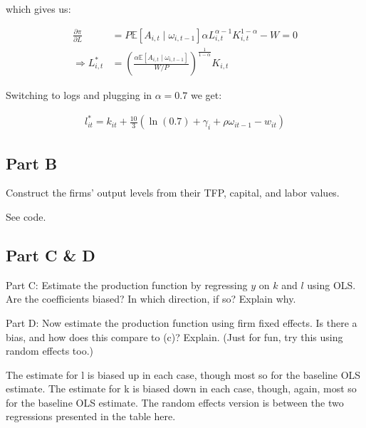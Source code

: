 \documentclass[10pt]{article}
\begin{document}
which gives us:

\begin{align}
    \frac{\partial \pi}{\partial L} &= P \mathbb{E}[A_{i,t} \mid \omega_{i, t-1}] \alpha L_{i,t}^{\alpha-1} K_{i,t}^{1-\alpha} - W = 0 \\
    \Rightarrow L_{i,t}^* &= \left(\frac{\alpha \mathbb{E}[A_{i,t} \mid \omega_{i, t-1}]}{W / P}\right)^{\frac{1}{1-\alpha}} K_{i,t}
\end{align}

Switching to logs and plugging in $\alpha = 0.7$ we get:

\begin{align}
    l_{i t}^*=k_{i t}+\frac{10}{3}\left(\ln (0.7)+\gamma_i+\rho \omega_{i t-1}-w_{i t}\right)
\end{align}


\subsection{Part B}

Construct the firms' output levels from their TFP, capital, and labor values.

\hrulefill\hspace{0.5em}\dotfill\hspace{0.5em}\hrulefill

See code.

\subsection{Part C \& D}

Part C: Estimate the production function by regressing $y$ on $k$ and $l$ using OLS. Are the coefficients biased? In which direction, if so? Explain why.

Part D: Now estimate the production function using firm fixed effects. Is there a bias, and how does this compare to (c)? Explain. (Just for fun, try this using random effects too.)

\hrulefill\hspace{0.5em}\dotfill\hspace{0.5em}\hrulefill

\FloatBarrier



The estimate for l is biased up in each case, though most so for 
the baseline OLS estimate. The estimate for k is biased down in each case,
though, again, most so for the baseline OLS estimate. The random effects 
version is between the two regressions presented in the table here.
\end{document}
